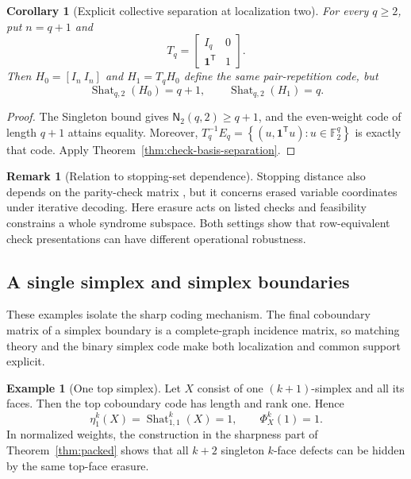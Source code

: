 \documentclass[11pt,letterpaper]{article}
\theoremstyle{plain}
\newtheorem{corollary}[theorem]{Corollary}
\theoremstyle{definition}
\newtheorem{remark}[theorem]{Remark}
\newtheorem{example}[theorem]{Example}
\newcommand{\F}{\mathbb{F}_2}
\newcommand{\Shat}{\operatorname{Shat}}
\newcommand{\1}{\mathbf{1}}
\newcommand{\set}[1]{\left\{#1\right\}}
\begin{document}
\begin{corollary}[Explicit collective separation at localization two]
\label{cor:explicit-q-separation}
For every $q\ge2$, put $n=q+1$ and
\[
 T_q=\begin{bmatrix}I_q&0\\ \mathbf1^{\mathsf T}&1\end{bmatrix}.
\]
Then $H_0=[I_n\ I_n]$ and $H_1=T_qH_0$ define the same pair-repetition code,
but
\[
 \Shat_{q,2}(H_0)=q+1,
 \qquad \Shat_{q,2}(H_1)=q.
\]
\end{corollary}

\begin{proof}
The Singleton bound gives $\mathsf N_2(q,2)\ge q+1$, and the even-weight
code of length $q+1$ attains equality.  Moreover,
$T_q^{-1}E_q=\set{(u,\1^{\mathsf T}u):u\in\F^q}$ is exactly that code.
Apply Theorem~\ref{thm:check-basis-separation}.
\end{proof}

\begin{remark}[Relation to stopping-set dependence]
Stopping distance also depends on the parity-check matrix
\cite{schwartzvardy2006}, but it concerns erased variable coordinates under
iterative decoding.  Here erasure acts on listed checks and feasibility
constrains a whole syndrome subspace.  Both settings show that row-equivalent
check presentations can have different operational robustness.
\end{remark}


\subsection{A single simplex and simplex boundaries}

These examples isolate the sharp coding mechanism.  The final coboundary matrix of a
simplex boundary is a complete-graph incidence matrix, so matching theory and the binary
simplex code make both localization and common support explicit.


\begin{example}[One top simplex]\label{ex:one-simplex}
Let $X$ consist of one $(k+1)$-simplex and all its faces.  Then the top coboundary code
has length and rank one.  Hence
\[
 \eta_1^k(X)=\Shat_{1,1}^k(X)=1,
 \qquad
 \Phi_X^k(1)=1.
\]
In normalized weights, the construction in the sharpness part of
Theorem~\ref{thm:packed} shows that all $k+2$ singleton $k$-face defects can be hidden by
the same top-face erasure.
\end{example}
\end{document}
